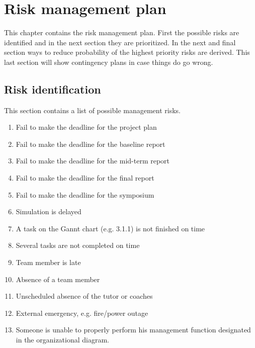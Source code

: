 \section{Risk management plan}
\label{dsePPRiskMP}
This chapter contains the risk management plan. First the possible risks are identified and in the next section they are prioritized. In the next and final section ways to reduce probability of the highest priority risks are derived. This last section will show contingency plans in case things do go wrong.
\subsection{Risk identification}
This section contains a list of possible management risks.
\begin{enumerate}
	\item Fail to make the deadline for the project plan
	\item Fail to make the deadline for the baseline report
	\item Fail to make the deadline for the mid-term report
	\item Fail to make the deadline for the final report
	\item Fail to make the deadline for the symposium
	\item Simulation is delayed
	\item A task on the Gannt chart (e.g. 3.1.1) is not finished on time
	\item Several tasks are not completed on time
	\item Team member is late
	\item Absence of a team member
	\item Unscheduled absence of the tutor or coaches
	\item External emergency, e.g. fire/power outage
	\item Someone is unable to properly perform his management function 		  						designated in the organizational diagram.
\end{enumerate}
